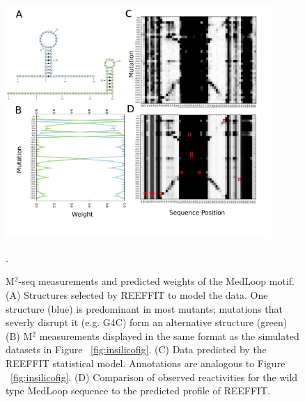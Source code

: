 \documentclass[12pt]{article}
\begin{document}
\begin{figure}[here]
\includegraphics[width=0.9\textwidth]{figures/medloop.png}
\caption{M$^2$-seq measurements and predicted weights of the MedLoop motif. (A) Structures selected by REEFFIT to model the data. One structure (blue) is predominant in most mutants; mutations that severly disrupt it (e.g. G4C) form an alternative structure (green)  (B) M$^2$ measurements displayed in the same format as the simulated datasets in Figure ~\ref{fig:insilicofig}. (C) Data predicted by the REEFFIT statistical model. Annotations are analogous to Figure ~\ref{fig:insilicofig}. (D) Comparison of observed reactivities for the wild type MedLoop sequence to the predicted profile of REEFFIT.}.
\label{fig:medloopfig}
\end{figure}
\end{document}
